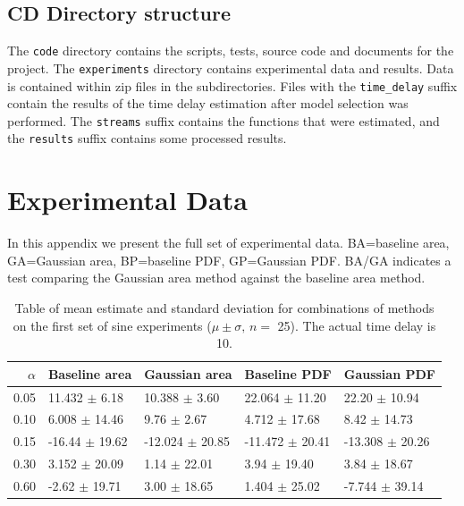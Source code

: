 \documentclass[a4paper,11pt]{article}
\begin{document}
\begin{appendices}
\subsection{CD Directory structure}
\label{sec-10-4}

   The \texttt{code} directory contains the scripts, tests, source code and
   documents for the project. The \texttt{experiments} directory contains
   experimental data and results. Data is contained within zip files in the
   subdirectories. Files with the \texttt{time\_delay} suffix contain the
   results of the time delay estimation after model selection was performed. The
   \texttt{streams} suffix contains the functions that were estimated, and the
   \texttt{results} suffix contains some processed results.
\section{Experimental Data}
\label{sec-11}

  In this appendix we present the full set of experimental data. BA=baseline area,
  GA=Gaussian area, BP=baseline PDF, GP=Gaussian PDF. BA/GA indicates a test
  comparing the Gaussian area method against the baseline area method.

  \begin{table}[htb]

  \begin{center}
  \begin{tabular}{r|llll}
  $\alpha$  &  Baseline area       &  Gaussian area        &  Baseline PDF         &  Gaussian PDF         \\
  \hline
  0.05  &  11.432 $\pm$ 6.18   &  10.388 $\pm$ 3.60    &  22.064 $\pm$ 11.20   &  22.20 $\pm$ 10.94    \\
  0.10  &  6.008 $\pm$ 14.46   &  9.76 $\pm$ 2.67      &  4.712 $\pm$ 17.68    &  8.42 $\pm$ 14.73     \\
  0.15  &  -16.44 $\pm$ 19.62  &  -12.024 $\pm$ 20.85  &  -11.472 $\pm$ 20.41  &  -13.308 $\pm$ 20.26  \\
  0.30  &  3.152 $\pm$ 20.09   &  1.14 $\pm$ 22.01     &  3.94 $\pm$ 19.40     &  3.84 $\pm$ 18.67     \\
  0.60  &  -2.62 $\pm$ 19.71   &  3.00 $\pm$ 18.65     &  1.404 $\pm$ 25.02    &  -7.744 $\pm$ 39.14   \\
  \end{tabular}
  \end{center} \caption{Table of mean estimate and standard deviation for
  combinations of methods on the first set of sine experiments ($\mu\pm\sigma,\,
  n=$ 25). The actual time delay is 10.} \label{tbl:sine1}\end{table}



\end{appendices}
\end{document}
